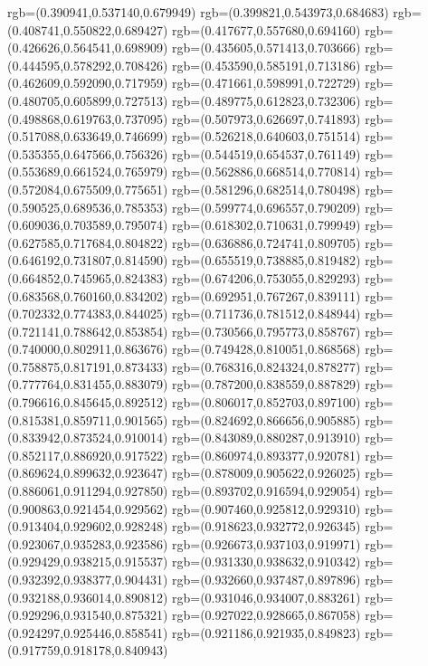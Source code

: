 {{{			rgb=(0.390941,0.537140,0.679949)
			rgb=(0.399821,0.543973,0.684683)
			rgb=(0.408741,0.550822,0.689427)
			rgb=(0.417677,0.557680,0.694160)
			rgb=(0.426626,0.564541,0.698909)
			rgb=(0.435605,0.571413,0.703666)
			rgb=(0.444595,0.578292,0.708426)
			rgb=(0.453590,0.585191,0.713186)
			rgb=(0.462609,0.592090,0.717959)
			rgb=(0.471661,0.598991,0.722729)
			rgb=(0.480705,0.605899,0.727513)
			rgb=(0.489775,0.612823,0.732306)
			rgb=(0.498868,0.619763,0.737095)
			rgb=(0.507973,0.626697,0.741893)
			rgb=(0.517088,0.633649,0.746699)
			rgb=(0.526218,0.640603,0.751514)
			rgb=(0.535355,0.647566,0.756326)
			rgb=(0.544519,0.654537,0.761149)
			rgb=(0.553689,0.661524,0.765979)
			rgb=(0.562886,0.668514,0.770814)
			rgb=(0.572084,0.675509,0.775651)
			rgb=(0.581296,0.682514,0.780498)
			rgb=(0.590525,0.689536,0.785353)
			rgb=(0.599774,0.696557,0.790209)
			rgb=(0.609036,0.703589,0.795074)
			rgb=(0.618302,0.710631,0.799949)
			rgb=(0.627585,0.717684,0.804822)
			rgb=(0.636886,0.724741,0.809705)
			rgb=(0.646192,0.731807,0.814590)
			rgb=(0.655519,0.738885,0.819482)
			rgb=(0.664852,0.745965,0.824383)
			rgb=(0.674206,0.753055,0.829293)
			rgb=(0.683568,0.760160,0.834202)
			rgb=(0.692951,0.767267,0.839111)
			rgb=(0.702332,0.774383,0.844025)
			rgb=(0.711736,0.781512,0.848944)
			rgb=(0.721141,0.788642,0.853854)
			rgb=(0.730566,0.795773,0.858767)
			rgb=(0.740000,0.802911,0.863676)
			rgb=(0.749428,0.810051,0.868568)
			rgb=(0.758875,0.817191,0.873433)
			rgb=(0.768316,0.824324,0.878277)
			rgb=(0.777764,0.831455,0.883079)
			rgb=(0.787200,0.838559,0.887829)
			rgb=(0.796616,0.845645,0.892512)
			rgb=(0.806017,0.852703,0.897100)
			rgb=(0.815381,0.859711,0.901565)
			rgb=(0.824692,0.866656,0.905885)
			rgb=(0.833942,0.873524,0.910014)
			rgb=(0.843089,0.880287,0.913910)
			rgb=(0.852117,0.886920,0.917522)
			rgb=(0.860974,0.893377,0.920781)
			rgb=(0.869624,0.899632,0.923647)
			rgb=(0.878009,0.905622,0.926025)
			rgb=(0.886061,0.911294,0.927850)
			rgb=(0.893702,0.916594,0.929054)
			rgb=(0.900863,0.921454,0.929562)
			rgb=(0.907460,0.925812,0.929310)
			rgb=(0.913404,0.929602,0.928248)
			rgb=(0.918623,0.932772,0.926345)
			rgb=(0.923067,0.935283,0.923586)
			rgb=(0.926673,0.937103,0.919971)
			rgb=(0.929429,0.938215,0.915537)
			rgb=(0.931330,0.938632,0.910342)
			rgb=(0.932392,0.938377,0.904431)
			rgb=(0.932660,0.937487,0.897896)
			rgb=(0.932188,0.936014,0.890812)
			rgb=(0.931046,0.934007,0.883261)
			rgb=(0.929296,0.931540,0.875321)
			rgb=(0.927022,0.928665,0.867058)
			rgb=(0.924297,0.925446,0.858541)
			rgb=(0.921186,0.921935,0.849823)
			rgb=(0.917759,0.918178,0.840943)
}}}
